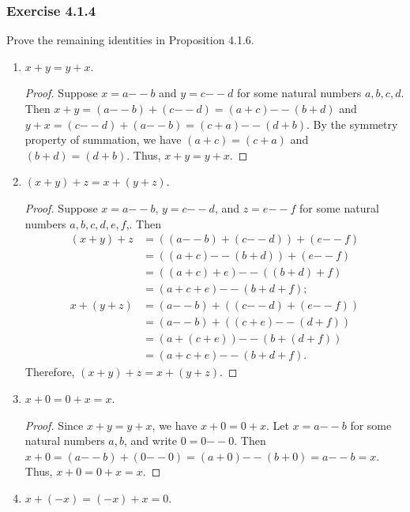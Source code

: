 \documentclass[12pt, letter]{article}
\begin{document}
\subsubsection*{Exercise 4.1.4}
Prove the remaining identities in Proposition 4.1.6.
\begin{enumerate}
    \item $x+y=y+x$.
    \begin{proof}
        Suppose $x=a\mathtt{--}b$ and $y=c\mathtt{--}d$ for some natural numbers $a,b,c,d$. Then $x+y=(a\mathtt{--}b)+(c\mathtt{--}d)=(a+c)\mathtt{--}(b+d)$ and $y+x=(c\mathtt{--}d)+(a\mathtt{--}b)=(c+a)\mathtt{--}(d+b)$. By the symmetry property of summation,
        we have $(a+c)=(c+a)$ and $(b+d)=(d+b)$. Thus, $x+y=y+x$.
    \end{proof}
    \item $(x+y)+z=x+(y+z)$.
    \begin{proof}
        Suppose $x=a\mathtt{--}b$, $y=c\mathtt{--}d$, and $z=e\mathtt{--}f$ for some natural numbers $a,b,c,d,e,f$,. Then 
        \begin{equation*}
            \begin{aligned}
                (x+y)+z&=((a\mathtt{--}b)+(c\mathtt{--}d))+(e\mathtt{--}f)\\
                &=((a+c)\mathtt{--}(b+d))+(e\mathtt{--}f)\\
                &=((a+c)+e)\mathtt{--}((b+d)+f)\\
                &=(a+c+e)\mathtt{--}(b+d+f);\\
                x+(y+z)&=(a\mathtt{--}b)+((c\mathtt{--}d)+(e\mathtt{--}f))\\
                &=(a\mathtt{--}b)+((c+e)\mathtt{--}(d+f))\\
                &=(a+(c+e))\mathtt{--}(b+(d+f))\\
                &=(a+c+e)\mathtt{--}(b+d+f).
            \end{aligned}
        \end{equation*}
        Therefore, $(x+y)+z=x+(y+z)$.
    \end{proof}
    \item $x+0=0+x=x$.
    \begin{proof}
        Since $x+y=y+x$, we have $x+0=0+x$. Let $x=a\mathtt{--}b$ for some natural numbers $a,b$, and write $0=0\mathtt{--}0$. Then $x+0=(a\mathtt{--}b)+(0\mathtt{--}0)=(a+0)\mathtt{--}(b+0)=a\mathtt{--}b=x$. 
        Thus, $x+0=0+x=x$.
    \end{proof}
    \item $x+(-x)=(-x)+x=0$.

\end{enumerate}
\end{document}
